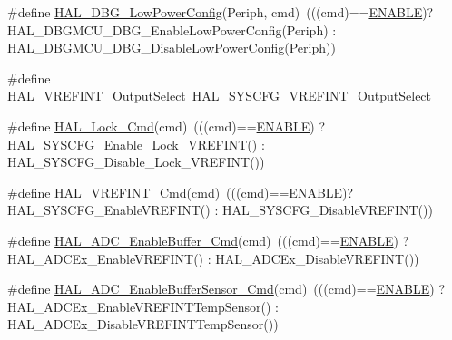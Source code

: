 \begin{DoxyCompactItemize}
\item 
\#define \hyperlink{group___h_a_l___aliased___functions_gaeece8fd3268534ce330c635222ce79a3}{H\+A\+L\+\_\+\+D\+B\+G\+\_\+\+Low\+Power\+Config}(Periph,  cmd)~(((cmd)==\hyperlink{group___exported__types_ggac9a7e9a35d2513ec15c3b537aaa4fba1a7d46875fa3ebd2c34d2756950eda83bf}{E\+N\+A\+B\+LE})? H\+A\+L\+\_\+\+D\+B\+G\+M\+C\+U\+\_\+\+D\+B\+G\+\_\+\+Enable\+Low\+Power\+Config(Periph) \+: H\+A\+L\+\_\+\+D\+B\+G\+M\+C\+U\+\_\+\+D\+B\+G\+\_\+\+Disable\+Low\+Power\+Config(Periph))
\item 
\#define \hyperlink{group___h_a_l___aliased___functions_ga2c3d2cdc9071cfc99696e78c29621852}{H\+A\+L\+\_\+\+V\+R\+E\+F\+I\+N\+T\+\_\+\+Output\+Select}~H\+A\+L\+\_\+\+S\+Y\+S\+C\+F\+G\+\_\+\+V\+R\+E\+F\+I\+N\+T\+\_\+\+Output\+Select
\item 
\#define \hyperlink{group___h_a_l___aliased___functions_ga72384357565be710258691efd3b3b72c}{H\+A\+L\+\_\+\+Lock\+\_\+\+Cmd}(cmd)~(((cmd)==\hyperlink{group___exported__types_ggac9a7e9a35d2513ec15c3b537aaa4fba1a7d46875fa3ebd2c34d2756950eda83bf}{E\+N\+A\+B\+LE}) ? H\+A\+L\+\_\+\+S\+Y\+S\+C\+F\+G\+\_\+\+Enable\+\_\+\+Lock\+\_\+\+V\+R\+E\+F\+I\+NT() \+: H\+A\+L\+\_\+\+S\+Y\+S\+C\+F\+G\+\_\+\+Disable\+\_\+\+Lock\+\_\+\+V\+R\+E\+F\+I\+NT())
\item 
\#define \hyperlink{group___h_a_l___aliased___functions_ga89195eed3652b3f7ce36e89f3cc8e3a6}{H\+A\+L\+\_\+\+V\+R\+E\+F\+I\+N\+T\+\_\+\+Cmd}(cmd)~(((cmd)==\hyperlink{group___exported__types_ggac9a7e9a35d2513ec15c3b537aaa4fba1a7d46875fa3ebd2c34d2756950eda83bf}{E\+N\+A\+B\+LE})? H\+A\+L\+\_\+\+S\+Y\+S\+C\+F\+G\+\_\+\+Enable\+V\+R\+E\+F\+I\+NT() \+: H\+A\+L\+\_\+\+S\+Y\+S\+C\+F\+G\+\_\+\+Disable\+V\+R\+E\+F\+I\+NT())
\item 
\#define \hyperlink{group___h_a_l___aliased___functions_ga2945c26e7b184a3ee89309906de33cd3}{H\+A\+L\+\_\+\+A\+D\+C\+\_\+\+Enable\+Buffer\+\_\+\+Cmd}(cmd)~(((cmd)==\hyperlink{group___exported__types_ggac9a7e9a35d2513ec15c3b537aaa4fba1a7d46875fa3ebd2c34d2756950eda83bf}{E\+N\+A\+B\+LE}) ? H\+A\+L\+\_\+\+A\+D\+C\+Ex\+\_\+\+Enable\+V\+R\+E\+F\+I\+NT() \+: H\+A\+L\+\_\+\+A\+D\+C\+Ex\+\_\+\+Disable\+V\+R\+E\+F\+I\+NT())
\item 
\#define \hyperlink{group___h_a_l___aliased___functions_ga674bce235a7be59ff19cca605b2e3ce8}{H\+A\+L\+\_\+\+A\+D\+C\+\_\+\+Enable\+Buffer\+Sensor\+\_\+\+Cmd}(cmd)~(((cmd)==\hyperlink{group___exported__types_ggac9a7e9a35d2513ec15c3b537aaa4fba1a7d46875fa3ebd2c34d2756950eda83bf}{E\+N\+A\+B\+LE}) ?  H\+A\+L\+\_\+\+A\+D\+C\+Ex\+\_\+\+Enable\+V\+R\+E\+F\+I\+N\+T\+Temp\+Sensor() \+: H\+A\+L\+\_\+\+A\+D\+C\+Ex\+\_\+\+Disable\+V\+R\+E\+F\+I\+N\+T\+Temp\+Sensor())
\end{DoxyCompactItemize}


